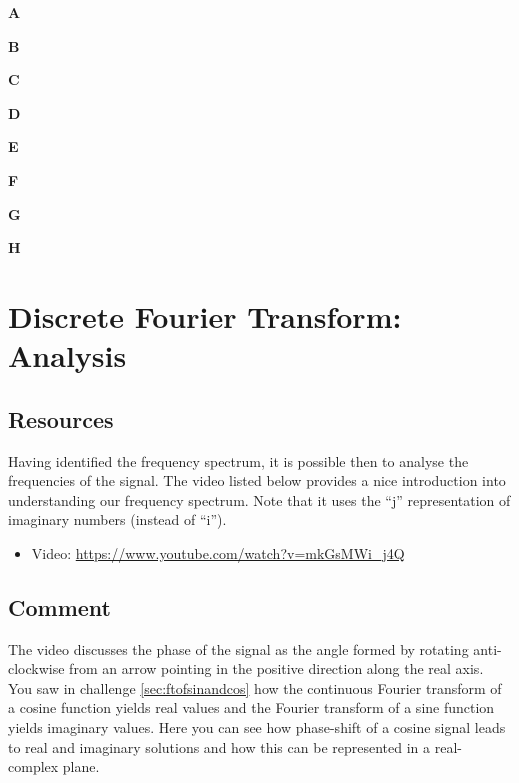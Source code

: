 \textbf{A}\\

\textbf{B}\\

\textbf{C}\\

\textbf{D}\\

\textbf{E}\\

\textbf{F}\\

\textbf{G}\\

\textbf{H}\\




\newpage
\section{Discrete Fourier Transform: Analysis}

\subsection*{Resources}
Having identified the frequency spectrum, it is possible then to analyse the frequencies of the signal. The video listed below provides a nice introduction into understanding our frequency spectrum. Note that it uses the ``j'' representation of imaginary numbers (instead of ``i'').

\begin{itemize}
    \item Video: \url{https://www.youtube.com/watch?v=mkGsMWi_j4Q}
\end{itemize}

\subsection*{Comment}
The video discusses the phase of the signal as the angle formed by rotating anti-clockwise from an arrow pointing in the positive direction along the real axis. You saw in challenge \ref{sec:ftofsinandcos} how the continuous Fourier transform of a cosine function yields real values and the Fourier transform of a sine function yields imaginary values. Here you can see how phase-shift of a cosine signal leads to real and imaginary solutions and how this can be represented in a real-complex plane.

